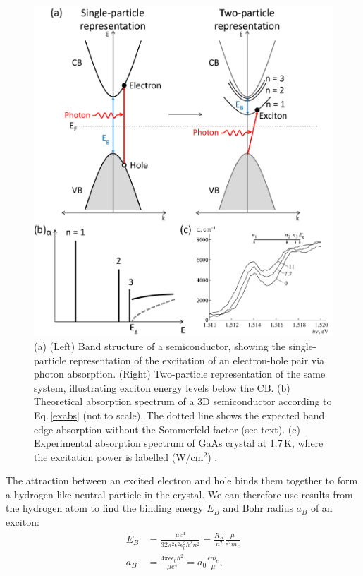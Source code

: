 \begin{figure}[h!] 
\centering    
\includegraphics[width=\textwidth]{Fig1}
\caption{(a) (Left) Band structure of a semiconductor, showing the single-particle representation of the excitation of an electron-hole pair via photon absorption. (Right) Two-particle representation of the same system, illustrating exciton energy levels below the CB. (b) Theoretical absorption spectrum of a 3D semiconductor according to Eq.\,\ref{exabs} (not to scale). The dotted line shows the expected band edge absorption without the Sommerfeld factor (see text). (c) Experimental absorption spectrum of GaAs crystal at 1.7\,K, where the excitation power is labelled (W/cm$^2$) \cite{Vaganov2013}.}
\label{2Fig1}
\end{figure}
The attraction between an excited electron and hole binds them together to form a hydrogen-like neutral particle in the crystal. We can therefore use results from the hydrogen atom to find the binding energy $E_B$ and Bohr radius $a_B$ of an exciton:
\begin{subequations}
\label{ex3D}
\begin{align}
E_B &=\frac{\mu e^4}{32\pi^2\epsilon^2\epsilon_0^2\hbar^2n^2} = \frac{R_H}{n^2}\frac{\mu}{\epsilon^2 m_e} \label{exbinding3D}\\
a_B &= \frac{4\pi\epsilon\epsilon_0\hbar^2}{\mu e^4}=a_0\frac{\epsilon m_e}{\mu} \label{exrad3D},
\end{align}
\end{subequations}
